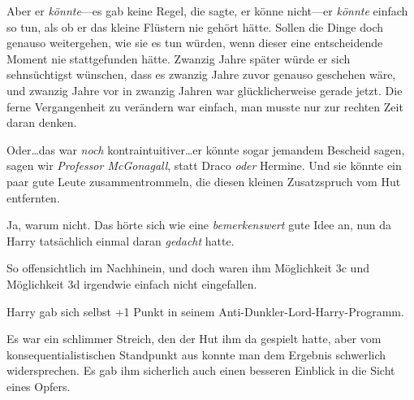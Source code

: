 Aber er \emph{könnte}—es gab keine Regel, die sagte, er könne nicht—er \emph{könnte} einfach so tun, als ob er das kleine Flüstern nie gehört hätte. Sollen die Dinge doch genauso weitergehen, wie sie es tun würden, wenn dieser eine entscheidende Moment nie stattgefunden hätte. Zwanzig Jahre später würde er sich sehnsüchtigst wünschen, dass es zwanzig Jahre zuvor genauso geschehen wäre, und zwanzig Jahre vor in zwanzig Jahren war glücklicherweise gerade jetzt. Die ferne Vergangenheit zu verändern war einfach, man musste nur zur rechten Zeit daran denken.

Oder…das war \emph{noch} kontraintuitiver…er könnte sogar jemandem Bescheid sagen, sagen wir \emph{Professor McGonagall}, statt Draco \emph{oder} Hermine. Und sie könnte ein paar gute Leute zusammentrommeln, die diesen kleinen Zusatzspruch vom Hut entfernten.

Ja, warum nicht. Das hörte sich wie eine \emph{bemerkenswert} gute Idee an, nun da Harry tatsächlich einmal daran \emph{gedacht} hatte.

So offensichtlich im Nachhinein, und doch waren ihm Möglichkeit 3c und Möglichkeit 3d irgendwie einfach nicht eingefallen.

Harry gab sich selbst +1 Punkt in seinem Anti-Dunkler-Lord-Harry-Programm.

Es war ein schlimmer Streich, den der Hut ihm da gespielt hatte, aber vom konsequentialistischen Standpunkt aus konnte man dem Ergebnis schwerlich widersprechen. Es gab ihm sicherlich auch einen besseren Einblick in die Sicht eines Opfers.

